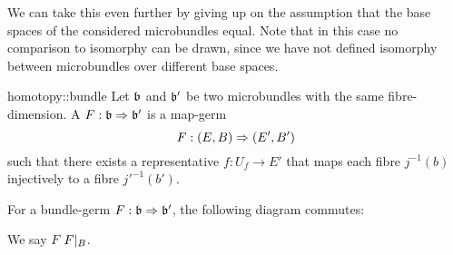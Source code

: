\begin{myparagraph}
    We can take this even further by giving up on the assumption that the base spaces of the considered microbundles equal.
    Note that in this case no comparison to isomorphy can be drawn,
    since we have not defined isomorphy between microbundles over different base spaces.
\end{myparagraph}

\begin{mydefinition}{homotopy::bundle}
    Let $\mathfrak{b}$ and $\mathfrak{b}'$ be two microbundles with the same fibre-dimension.
    A  $F: \mathfrak{b} \Rightarrow{} \mathfrak{b}'$ is a map-germ
    \[ F: (E, B) \Rightarrow{} (E', B') \]
    such that there exists a representative $f: U_f \to E'$ that maps each fibre $j^{-1}(b)$ injectively to a fibre $j'^{-1}(b')$.
\end{mydefinition}

\begin{myparagraph}
    For a bundle-germ $F: \mathfrak{b} \Rightarrow{} \mathfrak{b}'$, the following diagram commutes:
    \begin{center}
    \end{center}
    We say $F$  $F\vert_{B}$.
\end{myparagraph}